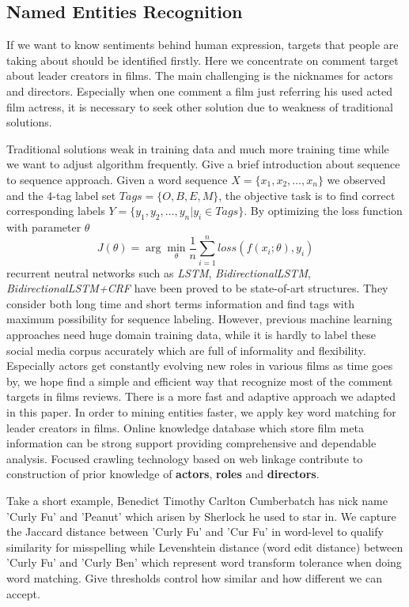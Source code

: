 \subsection{Named Entities Recognition}
\par If we want to know sentiments behind human expression, targets that people are taking about should be identified firstly. Here we concentrate on comment target about leader creators in films. The main challenging is the nicknames for actors and directors. Especially when one comment a film just referring his used acted film actress, it is necessary to seek other solution due to weakness of traditional solutions.
\par Traditional solutions weak in training data and much more training time while we want to adjust algorithm frequently. Give a brief introduction about sequence to sequence approach. Given a word sequence $X=\{x_1, x_2, \dots, x_n\}$ we observed and the 4-tag label set $Tags=\{O,B,E,M\}$, the objective task is to find correct corresponding labels $Y=\{y_1, y_2, \dots, y_n | y_i \in Tags\} $. By optimizing the loss function with parameter $ \theta $
\begin{equation}
    J(\theta)= \arg\min_{\theta} \frac{1}{n}\sum_{i=1}^{n}loss(f(x_i;\theta), y_i)
\end{equation}
recurrent neutral networks such as \emph{LSTM}, \emph{BidirectionalLSTM}, \emph{BidirectionalLSTM+CRF} \cite{chen2017improving} have been proved to be state-of-art structures. They consider both long time and short terms information and find tags with maximum possibility for sequence labeling. However, previous machine learning approaches need huge domain training data, while it is hardly to label these social media corpus accurately which are full of informality and flexibility. Especially actors get constantly evolving new roles in various films as time goes by, we hope find a simple and efficient way that recognize most of the comment targets in films reviews. There is a more fast and adaptive approach we adapted in this paper. In order to mining entities faster, we apply key word matching for leader creators in films. Online knowledge database which store film meta information can be strong support providing comprehensive and dependable analysis. Focused crawling technology based on web linkage contribute to construction of prior knowledge of \textbf{actors}, \textbf{roles} and \textbf{directors}. 

Take a short example, Benedict Timothy Carlton Cumberbatch has nick name 'Curly Fu' and 'Peanut' which arisen by Sherlock he used to star in. We capture the Jaccard distance between 'Curly Fu' and 'Cur Fu' in word-level to qualify similarity for misspelling while Levenshtein distance (word edit distance) between 'Curly Fu' and 'Curly Ben' which represent word transform tolerance when doing word matching. Give thresholds control how similar and how different we can accept.

